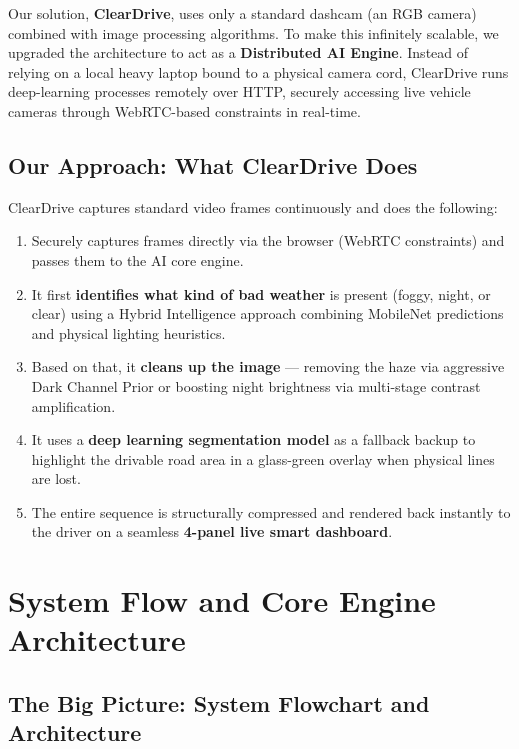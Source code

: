 \documentclass[12pt, a4paper]{article}
\begin{document}
Our solution, \textbf{ClearDrive}, uses only a standard dashcam (an RGB camera)
combined with image processing algorithms. To make this infinitely scalable, we upgraded the architecture to act as a \textbf{Distributed AI Engine}. Instead of relying on a local heavy laptop bound to a physical camera cord, ClearDrive runs deep-learning processes remotely over HTTP, securely accessing live vehicle cameras through WebRTC-based constraints in real-time.

\subsection{Our Approach: What ClearDrive Does}

ClearDrive captures standard video frames continuously and does the following:
\begin{enumerate}
  \item Securely captures frames directly via the browser (WebRTC constraints) and passes them to the AI core engine.
  \item It first \textbf{identifies what kind of bad weather} is present
  (foggy, night, or clear) using a Hybrid Intelligence approach combining MobileNet predictions and physical lighting heuristics.
  \item Based on that, it \textbf{cleans up the image} — removing the haze via aggressive Dark Channel Prior or boosting night brightness via multi-stage contrast amplification.
  \item It uses a \textbf{deep learning segmentation model} as a fallback backup to highlight the drivable road area in a glass-green overlay when physical lines are lost.
  \item The entire sequence is structurally compressed and rendered back instantly to the driver on a seamless \textbf{4-panel live smart dashboard}.
\end{enumerate}

\section{System Flow and Core Engine Architecture}

\subsection{The Big Picture: System Flowchart and Architecture}
\end{document}
